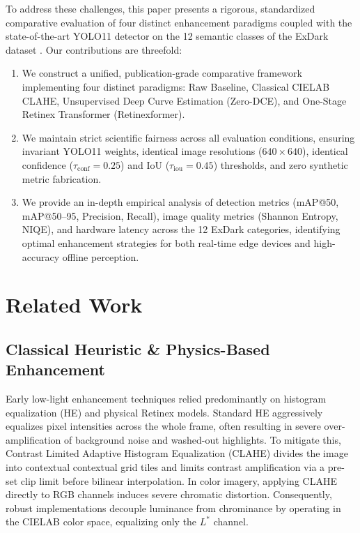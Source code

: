 \documentclass[conference]{IEEEtran}
\begin{document}
To address these challenges, this paper presents a rigorous, standardized comparative evaluation of four distinct enhancement paradigms coupled with the state-of-the-art YOLO11 \cite{jocher2024yolo11} detector on the 12 semantic classes of the ExDark dataset \cite{loh2019getting}. Our contributions are threefold:
\begin{enumerate}
    \item We construct a unified, publication-grade comparative framework implementing four distinct paradigms: Raw Baseline, Classical CIELAB CLAHE, Unsupervised Deep Curve Estimation (Zero-DCE), and One-Stage Retinex Transformer (Retinexformer).
    \item We maintain strict scientific fairness across all evaluation conditions, ensuring invariant YOLO11 weights, identical image resolutions ($640 \times 640$), identical confidence ($\tau_{\text{conf}}=0.25$) and IoU ($\tau_{\text{iou}}=0.45$) thresholds, and zero synthetic metric fabrication.
    \item We provide an in-depth empirical analysis of detection metrics (mAP@50, mAP@50--95, Precision, Recall), image quality metrics (Shannon Entropy, NIQE), and hardware latency across the 12 ExDark categories, identifying optimal enhancement strategies for both real-time edge devices and high-accuracy offline perception.
\end{enumerate}

\section{Related Work}

\subsection{Classical Heuristic \& Physics-Based Enhancement}
Early low-light enhancement techniques relied predominantly on histogram equalization (HE) and physical Retinex models. Standard HE aggressively equalizes pixel intensities across the whole frame, often resulting in severe over-amplification of background noise and washed-out highlights. To mitigate this, Contrast Limited Adaptive Histogram Equalization (CLAHE) \cite{reza2004realization} divides the image into contextual contextual grid tiles and limits contrast amplification via a pre-set clip limit before bilinear interpolation. In color imagery, applying CLAHE directly to RGB channels induces severe chromatic distortion. Consequently, robust implementations decouple luminance from chrominance by operating in the CIELAB color space, equalizing only the $L^*$ channel.
\end{document}
